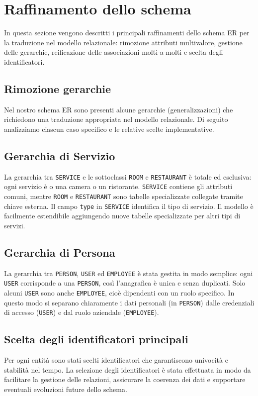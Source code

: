 \documentclass[a4paper,12pt]{report}
\begin{document}
\newpage
\section{Raffinamento dello schema}
In questa sezione vengono descritti i principali raffinamenti dello
schema ER per la traduzione nel modello relazionale: rimozione
attributi multivalore, gestione delle gerarchie, reificazione delle
associazioni molti-a-molti e scelta degli identificatori.

\subsection{Rimozione gerarchie}
Nel nostro schema ER sono presenti alcune gerarchie
(generalizzazioni) che richiedono una traduzione appropriata nel
modello relazionale. Di seguito analizziamo ciascun caso specifico e
le relative scelte implementative.

\subsection*{Gerarchia di Servizio}
La gerarchia tra \texttt{SERVICE} e le sottoclassi \texttt{ROOM} e
\texttt{RESTAURANT} è totale
ed esclusiva: ogni servizio è o una camera o un ristorante. \texttt{SERVICE}
contiene gli attributi comuni, mentre \texttt{ROOM} e
\texttt{RESTAURANT} sono tabelle
specializzate collegate tramite chiave esterna. Il campo
\texttt{type} in \texttt{SERVICE} identifica il tipo di servizio. Il modello è
facilmente estendibile aggiungendo nuove tabelle specializzate per
altri tipi di servizi.

\subsection*{Gerarchia di Persona}
La gerarchia tra \texttt{PERSON}, \texttt{USER} ed \texttt{EMPLOYEE}
è stata gestita in modo semplice: ogni \texttt{USER} corrisponde a
una \texttt{PERSON}, così l'anagrafica è unica e senza duplicati.
Solo alcuni \texttt{USER} sono anche \texttt{EMPLOYEE}, cioè
dipendenti con un ruolo specifico. In questo modo si separano
chiaramente i dati personali (in \texttt{PERSON}) dalle credenziali
di accesso (\texttt{USER}) e dal ruolo aziendale (\texttt{EMPLOYEE}).

\subsection{Scelta degli identificatori principali}
Per ogni entità sono stati scelti identificatori che garantiscono
univocità e stabilità nel tempo. La selezione degli identificatori è
stata effettuata in modo da facilitare la gestione delle relazioni,
assicurare la coerenza dei dati e supportare eventuali evoluzioni
future dello schema.
\end{document}
